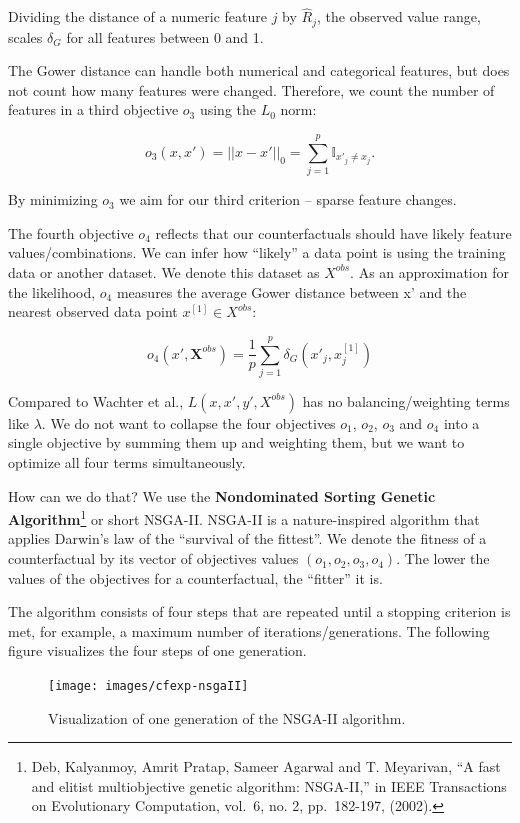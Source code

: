 \documentclass[
  11pt,
]{scrbook}
\begin{document}
Dividing the distance of a numeric feature \(j\) by \(\widehat{R}_j\), the observed value range, scales \(\delta_G\) for all features between 0 and 1.

The Gower distance can handle both numerical and categorical features, but does not count how many features were changed.
Therefore, we count the number of features in a third objective \(o_3\) using the \(L_0\) norm:

\[o_3(x,x')=||x-x'||_0=\sum_{j=1}^{p}\mathbb{I}_{x'_j\neq x_j}.\]

By minimizing \(o_3\) we aim for our third criterion -- sparse feature changes.

The fourth objective \(o_4\) reflects that our counterfactuals should have likely feature values/combinations.
We can infer how ``likely'' a data point is using the training data or another dataset.
We denote this dataset as \(X^{obs}\).
As an approximation for the likelihood, \(o_4\) measures the average Gower distance between x' and the nearest observed data point \(x^{[1]}\in{}X^{obs}\):

\[o_4(x',\textbf{X}^{obs})=\frac{1}{p}\sum_{j=1}^{p}\delta_G(x'_j,x^{[1]}_j)\]

Compared to Wachter et al., \(L(x,x',y',X^{obs})\) has no balancing/weighting terms like \(\lambda\).
We do not want to collapse the four objectives \(o_1\), \(o_2\), \(o_3\) and \(o_4\) into a single objective by summing them up and weighting them, but we want to optimize all four terms simultaneously.

How can we do that?
We use the \textbf{Nondominated Sorting Genetic Algorithm}\footnote{Deb, Kalyanmoy, Amrit Pratap, Sameer Agarwal and T. Meyarivan, ``A fast and elitist multiobjective genetic algorithm: NSGA-II,'' in IEEE Transactions on Evolutionary Computation, vol.~6, no. 2, pp.~182-197, (2002).} or short NSGA-II.
NSGA-II is a nature-inspired algorithm that applies Darwin's law of the ``survival of the fittest''.
We denote the fitness of a counterfactual by its vector of objectives values \((o_1,o_2,o_3,o_4)\).
The lower the values of the objectives for a counterfactual, the ``fitter'' it is.

The algorithm consists of four steps that are repeated until a stopping criterion is met, for example, a maximum number of iterations/generations.
The following figure visualizes the four steps of one generation.

\begin{figure}

{\centering \texttt{[image: images/cfexp-nsgaII]} 

}

\caption{Visualization of one generation of the NSGA-II algorithm.}\label{fig:nsgaII-cf}
\end{figure}
\end{document}
